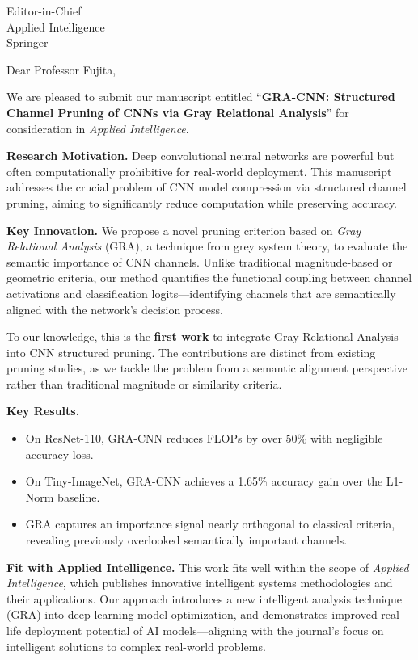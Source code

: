 \documentclass[11pt]{letter}
\begin{document}
\begin{letter}{Editor-in-Chief\\Applied Intelligence\\Springer}

\opening{Dear Professor Fujita,}

We are pleased to submit our manuscript entitled ``\textbf{GRA-CNN: Structured Channel Pruning of CNNs via Gray Relational Analysis}'' for consideration in \emph{Applied Intelligence}.

\textbf{Research Motivation.}
Deep convolutional neural networks are powerful but often computationally prohibitive for real-world deployment. This manuscript addresses the crucial problem of CNN model compression via structured channel pruning, aiming to significantly reduce computation while preserving accuracy.

\textbf{Key Innovation.}
We propose a novel pruning criterion based on \emph{Gray Relational Analysis} (GRA), a technique from grey system theory, to evaluate the semantic importance of CNN channels. Unlike traditional magnitude-based or geometric criteria, our method quantifies the functional coupling between channel activations and classification logits---identifying channels that are semantically aligned with the network's decision process.

To our knowledge, this is the \textbf{first work} to integrate Gray Relational Analysis into CNN structured pruning. The contributions are distinct from existing pruning studies, as we tackle the problem from a semantic alignment perspective rather than traditional magnitude or similarity criteria.

\textbf{Key Results.}
\begin{itemize}
    \item On ResNet-110, GRA-CNN reduces FLOPs by over 50\% with negligible accuracy loss.
    \item On Tiny-ImageNet, GRA-CNN achieves a 1.65\% accuracy gain over the L1-Norm baseline.
    \item GRA captures an importance signal nearly orthogonal to classical criteria, revealing previously overlooked semantically important channels.
\end{itemize}

\textbf{Fit with Applied Intelligence.}
This work fits well within the scope of \emph{Applied Intelligence}, which publishes innovative intelligent systems methodologies and their applications. Our approach introduces a new intelligent analysis technique (GRA) into deep learning model optimization, and demonstrates improved real-life deployment potential of AI models---aligning with the journal's focus on intelligent solutions to complex real-world problems.


\end{letter}
\end{document}
